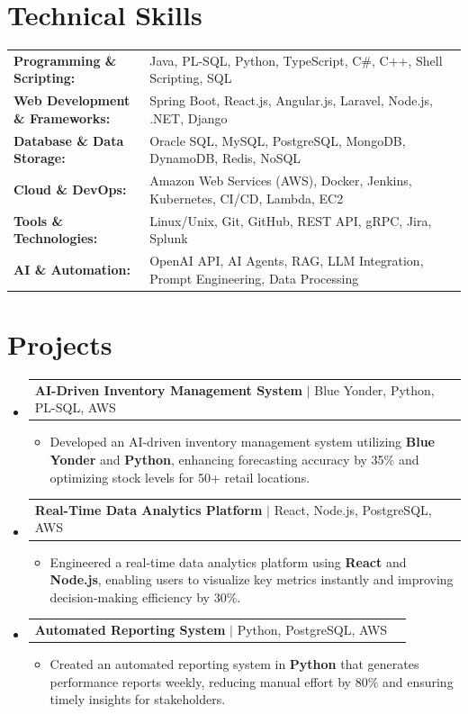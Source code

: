 \documentclass[letterpaper,10pt]{article}
\makeatletter
\newcommand{\resumeItem}[1]{
  \item{\fontsize{8pt}{9pt}\selectfont
    #1 \vspace{-3pt}
  }
}
\newcommand{\resumeProjectHeading}[2]{
    \item
    \begin{tabular*}{1.001\textwidth}{l@{\extracolsep{\fill}}r}
      \fontsize{8.5pt}{10pt}#1 & \textbf{\fontsize{8.5pt}{10pt} #2}\\
    \end{tabular*}\vspace{-7pt}
}
\newcommand{\resumeSubHeadingListStart}{\begin{itemize}[leftmargin=0pt, label={}]}
\newcommand{\resumeSubHeadingListEnd}{\end{itemize}}
\newcommand{\resumeItemListStart}{\begin{itemize}[leftmargin=*]}
\newcommand{\resumeItemListEnd}{\end{itemize}\vspace{-5pt}}
\makeatother
\begin{document}
\section{Technical Skills}
        \vspace{-14pt}
        \begin{table}[h]
            \fontsize{8pt}{9pt}\selectfont
            \begin{tabular}{p{0.3\linewidth} p{0.7\linewidth}}
                \textbf{Programming \& Scripting:} & Java, PL-SQL, Python, TypeScript, C\#, C++, Shell Scripting, SQL \\
                \textbf{Web Development \& Frameworks:} & Spring Boot, React.js, Angular.js, Laravel, Node.js, .NET, Django \\
                \textbf{Database \& Data Storage:} & Oracle SQL, MySQL, PostgreSQL, MongoDB, DynamoDB, Redis, NoSQL \\
                \textbf{Cloud \& DevOps:} & Amazon Web Services (AWS), Docker, Jenkins, Kubernetes, CI/CD, Lambda, EC2 \\
                \textbf{Tools \& Technologies:} & Linux/Unix, Git, GitHub, REST API, gRPC, Jira, Splunk \\
                \textbf{AI \& Automation:} & OpenAI API, AI Agents, RAG, LLM Integration, Prompt Engineering, Data Processing \\
            \end{tabular}
        \end{table}
 \vspace{-18pt}

\section{Projects}
    \vspace{-5pt}
    \resumeSubHeadingListStart
          \resumeProjectHeading
            {\textbf{AI-Driven Inventory Management System} $|$ Blue Yonder, Python, PL-SQL, AWS}{}
            \resumeItemListStart
                \resumeItem{Developed an AI-driven inventory management system utilizing \textbf{Blue Yonder} and \textbf{Python}, enhancing forecasting accuracy by 35\% and optimizing stock levels for 50+ retail locations.}
            \resumeItemListEnd
        \vspace{-12pt}
    
        \resumeProjectHeading
            {\textbf{Real-Time Data Analytics Platform} $|$ React, Node.js, PostgreSQL, AWS}{}
        \resumeItemListStart
                \resumeItem{Engineered a real-time data analytics platform using \textbf{React} and \textbf{Node.js}, enabling users to visualize key metrics instantly and improving decision-making efficiency by 30\%.}
        \resumeItemListEnd
      \vspace{-12pt}
      \resumeProjectHeading
        {\textbf{Automated Reporting System} $|$ Python, PostgreSQL, AWS}{}
    \resumeItemListStart
            \resumeItem{Created an automated reporting system in \textbf{Python} that generates performance reports weekly, reducing manual effort by 80\% and ensuring timely insights for stakeholders.}
    \resumeItemListEnd
    \resumeSubHeadingListEnd
\end{document}
